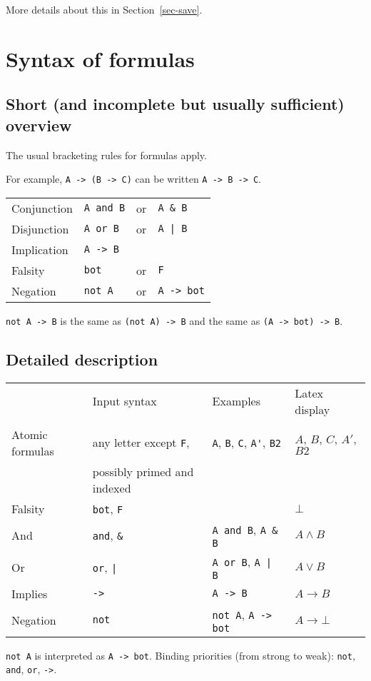 \documentclass[12pt]{article}
\begin{document}
More details about this in Section~\ref{sec-save}.


\section{Syntax of formulas}
\label{sec-syntax}

\subsection*{Short (and incomplete but usually sufficient) overview}
%
The usual bracketing rules for formulas apply.

For example, \verb|A -> (B -> C)| can be written \verb|A -> B -> C|.
%
\begin{center}
\begin{tabular}{llll}
Conjunction     &   \verb|A and B|   &or&  \verb|A & B|\\ 
Disjunction     &   \verb|A or B|    &or&  \verb!A | B!\\ 
Implication     &    \verb|A -> B|   && \\
Falsity         &   \verb|bot|       &or& \verb|F|\\
Negation        &   \verb|not A|     &or& \verb|A -> bot|
\end{tabular}
\end{center}
\verb|not A -> B|   is the same as  \verb|(not A) -> B|   and the same as 
\verb|(A -> bot) -> B|.


\subsection*{Detailed description}

\begin{center}
\begin{tabular}{llll}
        &  Input syntax           
        & Examples   
        & Latex display 
\\
&&&
\\
Atomic formulas    
        & any letter except \verb|F|, 
        & \verb|A|, \verb|B|, \verb|C|, \verb|A'|, \verb|B2| 
        & $A$, $B$, $C$, $A'$, $B2$
             \\ & possibly primed and indexed &&
\\
Falsity               
        & \verb|bot|, \verb|F| 
        &
        & $\bot$
\\
And                   
        & \verb|and|, \verb|&|  
        & \verb|A and B|, \verb|A & B|
        & $A\land B$
\\   
Or                    
        & \verb|or|, \verb!|!
        & \verb|A or B|, \verb!A | B!
        & $A \lor B$   
\\
Implies 
        & \verb|->|                    
        & \verb|A -> B|
        & $A \to B$
\\
Negation
        & \verb|not|
        & \verb|not A|, \verb|A -> bot|
        & $A \to \bot$
\end{tabular}
\end{center}
\verb|not A| is interpreted as  \verb|A -> bot|.
%                      
Binding priorities (from strong to weak):  
\verb|not|, \verb|and|, \verb|or|, \verb|->|.   
\end{document}
